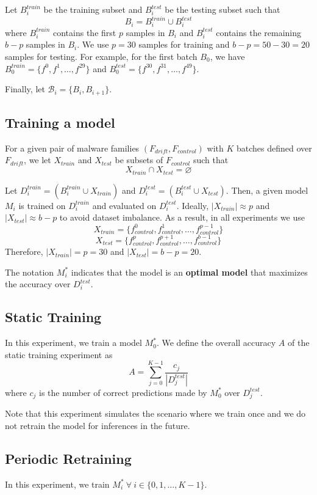 Let $B_{i}^{train}$ be the training subset and $B_{i}^{test}$ be the testing subset such that
$$B_{i} = B_{i}^{train} \cup B_{i}^{test}$$
where $B_{i}^{train}$ contains the first $p$ samples in $B_{i}$ and
$B_{i}^{test}$ contains the remaining $b - p$ samples in $B_{i}$. We use
$p = 30$ samples for training and $b - p = 50 - 30 = 20$ samples for testing.
For example, for the first batch $B_{0}$, we have
$B_{0}^{train} = \{f^{0}, f^{1}, \ldots, f^{29}\}$
and
$B_{0}^{test} = \{f^{30}, f^{31}, \ldots, f^{49}\}$.

Finally, let $\mathcal{B}_i = \{B_i, B_{i+1}\}$.

\subsection{Training a model}
For a given pair of malware families $(F_{drift}, F_{control})$ with $K$ batches
defined over $F_{drift}$, we let $X_{train}$ and $X_{test}$ be
subsets of $F_{control}$ such that
$$X_{train} \cap X_{test} = \varnothing$$

Let $D_{i}^{train} = (B_{i}^{train} \cup X_{train})$ and
$D_{i}^{test} = (B_{i}^{test} \cup X_{test})$. Then, a given model
$M_i$ is trained on $D_{i}^{train}$ and evaluated on $D_{i}^{test}$.
Ideally, $|X_{train}| \approx p$ and $|X_{test}| \approx b - p$ to avoid
dataset imbalance. As a result, in all experiments we use
$$X_{train} = \{f_{control}^{0}, f_{control}^{1}, \ldots, f_{control}^{p-1}\}$$
$$X_{test} = \{f_{control}^{p}, f_{control}^{p+1}, \ldots, f_{control}^{b-1}\}$$
Therefore, $|X_{train}| = p = 30$ and $|X_{test}| = b - p = 20$.

The notation $M_i^*$ indicates that the model is an \textbf{optimal model}
that maximizes the accuracy over $D_{i}^{test}$.

\subsection{Static Training\label{sec:static_training}}
In this experiment, we train a model $M_0^*$. We define the overall accuracy $A$
of the static training experiment
as
$$A = \sum_{j=0}^{K-1} \frac{c_j}{|D_j^{test}|}$$
where $c_j$ is the number of correct predictions made by $M_0^*$ over $D_j^{test}$.

Note that this experiment simulates the scenario where we train once
and we do not retrain the model for inferences in the future.

\subsection{Periodic Retraining\label{sec:periodic_retraining}}
In this experiment, we train $M_i^* ~\forall~i \in \{0, 1, \ldots, K-1\}$.

